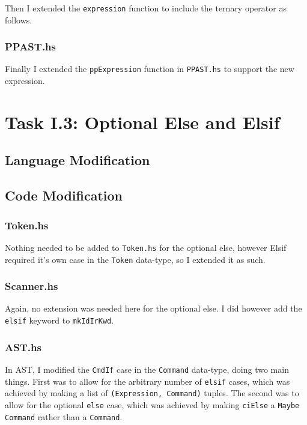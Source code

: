 \documentclass[12pt]{article}
\newcommand{\lstin}[3]{%
  
}
\begin{document}
\lstin{74}{74}{Parser.y}
\lstin{99}{99}{Parser.y}

Then I extended the \verb|expression| function to include the ternary operator as follows.

\lstin{185}{189}{Parser.y}

\subsubsection{PPAST.hs}
Finally I extended the \verb|ppExpression| function in \verb|PPAST.hs| to support the new expression.

\lstin{104}{108}{PPAST.hs}

\section{Task I.3: Optional Else and Elsif}
\subsection{Language Modification}

\subsection{Code Modification}
\subsubsection{Token.hs}
Nothing needed to be added to \verb|Token.hs| for the optional else, however Elsif required it's own case in the \verb|Token| data-type, so I extended it as such.

\lstin{49}{49}{Token.hs}

\subsubsection{Scanner.hs}
Again, no extension was needed here for the optional else. 
I did however add the \verb|elsif| keyword to \verb|mkIdIrKwd|.

\lstin{155}{155}{Scanner.hs}

\subsubsection{AST.hs}
In AST, I modified the \verb|CmdIf| case in the \verb|Command| data-type, doing two main things. 
First was to allow for the arbitrary number of \verb|elsif| cases, which was achieved by making a list of \verb|(Expression, Command)| tuples. 
The second was to allow for the optional \verb|else| case, which was achieved by making \verb|ciElse| a \verb|Maybe Command| rather than a \verb|Command|.
\end{document}
